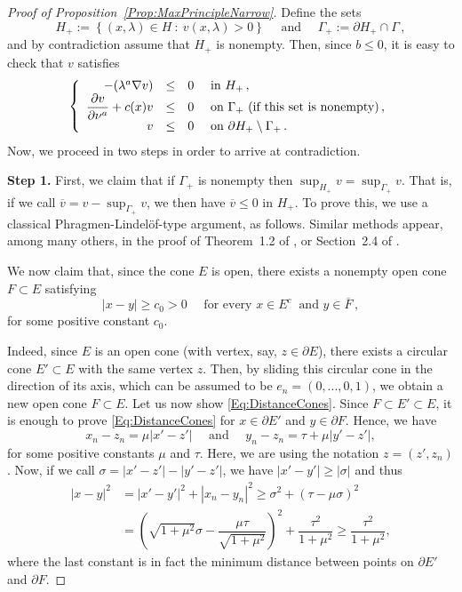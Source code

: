 \documentclass[12pt,reqno]{amsart}
\theoremstyle{definition}
\theoremstyle{remark}
\newcommand\beqc[1]{\left\{\begin{array}{#1}}
\newcommand\eeqc{\end{array} \right.}
\def\PDEsystem{rcll}
\let\div\relax
\DeclareMathOperator{\div}{div}
\numberwithin{equation}{section}
\begin{document}
\begin{proof}[Proof of Proposition~\ref{Prop:MaxPrincipleNarrow}] 
	Define the sets 
	$$
	H_+ := \left\{(x,\lambda) \in H \ : \ v(x,\lambda)>0 \right\} 
	\quad \text{ and } \quad 
	\Gamma_+ := \partial H_+ \cap \Gamma\,,
	$$ 
	and by contradiction assume that $H_+$ is nonempty. Then, since $b\leq 0$, it is easy to check that $v$ satisfies
	$$
	\beqc{\PDEsystem}
	-\div(\lambda^a \nabla v) &\leq& 0 & \text{ in } H_+\,, \\
	\dfrac{\partial v}{\partial \nu^a}  + c(x) v &\leq & 0 & \text{ on } \Gamma_+ \text{ (if this set is nonempty)}\,, \\
	v & \leq & 0 & \text{ on } \partial H_+ \setminus \Gamma_+\,.
	\eeqc
	$$
	Now, we proceed in two steps in order to arrive at contradiction.
	
	\textbf{Step 1.}
	First, we claim that if $\Gamma_+$ is nonempty then $\sup_{H_+} v = \sup_{\Gamma_+} v $. That is, if we call $\overline{v} = v - \sup_{\Gamma_+} v$, we then have $\overline{v} \leq 0$ in $H_+$. To prove this, we use a classical Phragmen-Lindelöf-type argument, as follows. Similar methods appear, among many others, in the proof of Theorem~1.2 of \cite{BerestyckiCaffarelliNiremberg-Monotonicity}, or Section~2.4 of \cite{CabreSolaMorales}.
	
	We now claim that, since the cone $E$ is open, there exists a nonempty open cone $F \subset E$ satisfying
	\begin{equation}
	\label{Eq:DistanceCones}
	|x-y| \geq c_0 > 0 \quad \text{ for every } x\in E^c \ \text{ and } y \in \overline{F}\,,
	\end{equation}
	for some positive constant $c_0$.
	
	Indeed, since $E$ is an open cone (with vertex, say, $z\in \partial E$), there exists a circular cone $E'\subset E$ with the same vertex $z$. Then, by sliding this circular cone in the direction of its axis, which can be assumed to be $e_n = (0,...,0,1)$, we obtain a new open cone $F\subset E$. Let us now show \eqref{Eq:DistanceCones}. Since $F \subset E' \subset E$, it is enough to prove \eqref{Eq:DistanceCones} for $x\in \partial E'$ and $ y\in\partial F$. Hence, we have
	$$x_n-z_n = \mu |x'-z'| \quad \text{ and } \quad y_n-z_n = \tau + \mu |y'-z'|, $$
	for some positive constants $\mu$ and $\tau$. Here, we are using the notation $z = (z',z_n)$. Now, if we call $\sigma = |x'-z'|-|y'-z'|$, we have $|x'-y'|\geq |\sigma|$ and thus
	\begin{align*}
	|x-y|^2 &= |x'-y'|^2 + |x_n-y_n|^2 \geq \sigma^2 + (\tau- \mu \sigma)^2   \\
	&= \left ( \sqrt{1+\mu^2} \sigma - \dfrac{\mu\tau}{\sqrt{1+\mu^2}}\right )^2 + \dfrac{\tau^2}{1+\mu^2}\geq\dfrac{\tau^2}{1+\mu^2},
	\end{align*}
	where the last constant is in fact the minimum distance between points on $\partial E'$ and $\partial F$. 
	

\end{proof}
\end{document}
